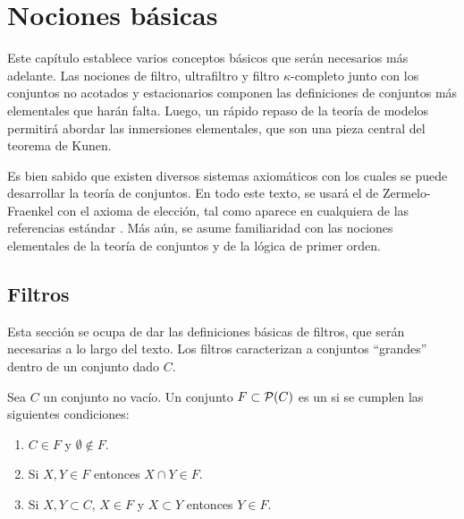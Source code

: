 \fi
\mainmatter
\ifbasicos
\chapter{Nociones básicas}

Este capítulo establece varios conceptos básicos que serán necesarios
más adelante. Las nociones de filtro, ultrafiltro y filtro $\kappa$-completo
junto con los conjuntos no acotados y estacionarios componen las definiciones de
conjuntos más elementales que harán falta.
Luego, un rápido repaso de la teoría de modelos permitirá abordar las inmersiones
elementales, que son una pieza central del teorema de Kunen.

Es bien sabido que existen diversos sistemas axiomáticos
con los cuales se puede desarrollar la teoría de conjuntos.
En todo este texto, se usará el de Zermelo-Fraenkel con el axioma de elección, tal como
aparece en cualquiera de las referencias estándar \autocite{kunen_set_2013,jech_set_2003}.
Más aún, se asume familiaridad con las nociones elementales de la teoría de conjuntos
y de la lógica de primer orden.

\section{Filtros}

Esta sección se ocupa de dar las definiciones básicas de filtros,
que serán necesarias a lo largo del texto.
Los filtros caracterizan a conjuntos ``grandes'' dentro
de un conjunto dado $C$.

\begin{defi}
    Sea $C$ un conjunto no vacío. Un conjunto $F\subset \pwset{C}$ es un
     si se cumplen las siguientes condiciones:
    \begin{enumerate}[label=\alph*)]
        \item $C\in F$ y $\emptyset\notin F$.
        \item Si $X,Y\in F$ entonces $X\cap Y\in F$.
        \item Si $X,Y\subset C$, $X\in F$ y $X\subset Y$ entonces $Y\in F$.
    \end{enumerate}
\end{defi}

